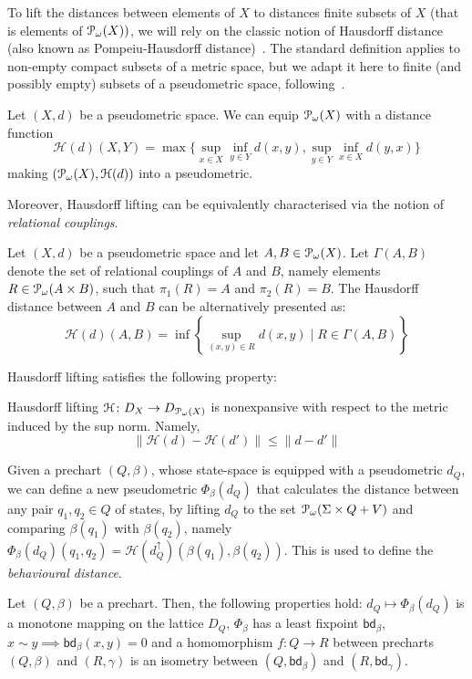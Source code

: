 To lift the distances between elements of $X$ to distances finite subsets of $X$ (that is elements of $\mathcal{P}_\omega (X))$, we will rely on the classic notion of Hausdorff distance (also known as Pompeiu-Hausdorff distance)~\cite{Birsan:2006:One}. The standard definition applies to non-empty compact subsets of a metric space, but we adapt it here to finite (and possibly empty) subsets of a pseudometric space, following~\cite{Baldan:2018:Coalgebraic}.
\begin{definition}\label{def:hausdorff}
	Let $(X,d)$ be a pseudometric space. We can equip $\mathcal{P}_\omega (X)$ with a distance function $$
	\mathcal{H}(d)(X,Y)= \max \{\sup_{x \in X} \inf_{y \in Y} d(x,y), \sup_{y \in Y} \inf_{x \in X} d(y,x) \}$$ making $(\mathcal{P}_\omega(X), \mathcal{H}(d))$ into a pseudometric.
\end{definition}
Moreover, Hausdorff lifting can be equivalently characterised via the notion of \emph{relational couplings}.
\begin{remark}\label{rem:hausdorff_duality}
Let $(X, d)$ be a pseudometric space and let $A, B \in \mathcal{P}_\omega(X)$. Let $\Gamma(A,B)$ denote the set of relational couplings of $A$ and $B$, namely elements $R \in \mathcal{P}_\omega(A \times B)$, such that $\pi_1 (R)=A$ and $\pi_2(R)=B$. The Hausdorff distance between $A$ and $B$ can be alternatively presented as:
$$
	\mathcal{H}(d)(A,B) = \inf \left\{\sup_{(x,y) \in R} d(x,y) \mid R \in \Gamma(A,B) \right\}
$$
\end{remark}
Hausdorff lifting satisfies the following property:
\begin{lemma}
	Hausdorff lifting $\mathcal{H} \colon D_X \to D_{\mathcal{P}_\omega(X)}$ is nonexpansive with respect to the metric induced by the sup norm. Namely,
	$$\|\mathcal{H}(d) - \mathcal{H}(d')\| \leq \|d - d' \|$$ 
\end{lemma}
Given a prechart $(Q, \beta)$, whose state-space is equipped with a pseudometric $d_Q$, we can define a new pseudometric $\Phi_{\beta}(d_Q)$ that calculates the distance between any pair $q_1, q_2 \in Q$ of states, by lifting $d_Q$ to the set $\mathcal{P}_\omega(\Sigma \times Q + V)$ and comparing $\beta(q_1)$ with $\beta(q_2)$, namely 
	$
		\Phi_\beta(d_Q)(q_1,q_2) = \mathcal{H}\left(d_Q^\uparrow\right) (\beta(q_1), \beta(q_2))
	$. This is used to define the \emph{behavioural distance}.
	\begin{theorem}\label{thm:beh_dist}
		Let $(Q, \beta)$ be a prechart. Then, the following properties hold:  $d_Q \mapsto \Phi_\beta(d_Q)$ is a monotone mapping on the lattice $D_Q$,  $\Phi_\beta$ has a least fixpoint $\mathsf{bd}_\beta$,  $x \sim y \implies \mathsf{bd}_\beta(x,y) = 0$ and  a homomorphism $f \colon Q \to R$ between precharts $(Q, \beta)$ and $(R, \gamma)$ is an isometry between $(Q, \mathsf{bd}_\beta)$ and $(R, \mathsf{bd}_\gamma)$.
	\end{theorem}
